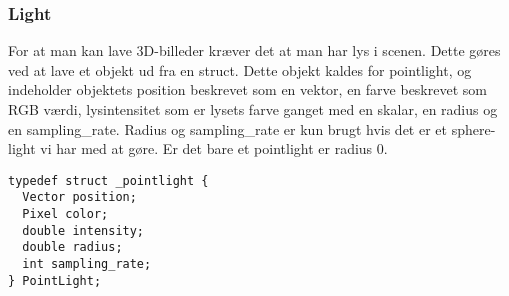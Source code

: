 \subsubsection{Light}
For at man kan lave 3D-billeder kræver det at man har lys i scenen. Dette gøres ved at lave et objekt ud fra en struct. Dette objekt kaldes for pointlight, og indeholder objektets position beskrevet som en vektor, en farve beskrevet som RGB værdi, lysintensitet som er lysets farve ganget med en skalar, en radius og en sampling_rate. Radius og sampling_rate er kun brugt hvis det er et sphere-light vi har med at gøre. Er det bare et pointlight er radius 0.

\begin{lstlisting}[style=Cstyle, caption=light struct]
typedef struct _pointlight {
  Vector position;
  Pixel color;
  double intensity;
  double radius;
  int sampling_rate;
} PointLight;
\end{lstlisting}